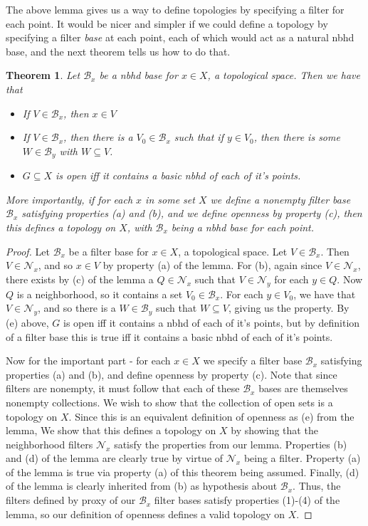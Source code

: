 \documentclass{article}
\theoremstyle{definition}
\theoremstyle{plain}
\theoremstyle{theorem}
\newtheorem{theorem}{Theorem}[section]
\begin{document}
	The above lemma gives us a way to define topologies by specifying a filter for each point. It would be nicer and simpler if we could define a topology by specifying a filter \textit{base} at each point, each of which would act as a natural nbhd base, and the next theorem tells us how to do that.
	\begin{theorem}
		Let $\mathcal{B}_x$ be a nbhd base for $x \in X$, a topological space. Then we have that 
		\begin{itemize}
			\item[(a)] If $V \in \mathcal{B}_x$, then $x \in V$
			\item[(b)] If $V \in \mathcal{B}_x$, then there is a $V_0 \in \mathcal{B}_x$ such that if $y \in V_0$, then there is some $W \in \mathcal{B}_y$ with $W \subseteq V$. 
			\item[(c)] $G \subseteq X$ is open iff it contains a basic nbhd of each of it's points.
		\end{itemize}
		More importantly, if for each $x$ in some set $X$ we define a nonempty filter base $\mathcal{B}_x$ satisfying properties (a) and (b), and we define openness by property (c), then this defines a topology on $X$, with $\mathcal{B}_x$ being a nbhd base for each point. 
	\end{theorem}
	\begin{proof}
		Let $\mathcal{B}_x$ be a filter base for $x \in X$, a topological space. Let $V \in \mathcal{B}_x$. Then $V \in \mathcal{N}_x$, and so $x \in V$ by property (a) of the lemma. For (b), again since $V \in \mathcal{N}_x$, there exists by (c) of the lemma a $Q \in \mathcal{N}_x$ such that $V \in \mathcal{N}_y$ for each $y \in Q$. Now $Q$ is a neighborhood, so it contains a set $V_0 \in \mathcal{B}_x$. For each $y \in V_0$, we have that $V \in \mathcal{N}_y$, and so there is a $W \in \mathcal{B}_y$ such that $W \subseteq V$, giving us the property. By (e) above, $G$ is open iff it contains a nbhd of each of it's points, but by definition of a filter base this is true iff it contains a basic nbhd of each of it's points.
		\par Now for the important part - for each $x \in X$ we specify a filter base $\mathcal{B}_x$ satisfying properties (a) and (b), and define openness by property (c). Note that since filters are nonempty, it must follow that each of these $\mathcal{B}_x$ bases are themselves nonempty collections. We wish to show that the collection of open sets is a topology on $X$. Since this is an equivalent definition of openness as (e) from the lemma, We show that this defines a topology on $X$ by showing that the neighborhood filters $\mathcal{N}_x$ satisfy the properties from our lemma. Properties (b) and (d) of the lemma are clearly true by virtue of $\mathcal{N}_x$ being a filter. Property (a) of the lemma is true via property (a) of this theorem being assumed. Finally, (d) of the lemma is clearly inherited from (b) as hypothesis about $\mathcal{B}_x$. Thus, the filters defined by proxy of our $\mathcal{B}_x$ filter bases satisfy properties (1)-(4) of the lemma, so our definition of openness defines a valid topology on $X$. 
	\end{proof}
\end{document}
